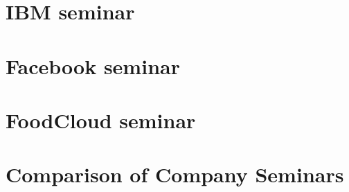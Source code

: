 \section{IBM seminar}



\section{Facebook seminar}



\section{FoodCloud seminar}



\section{Comparison of Company Seminars}
